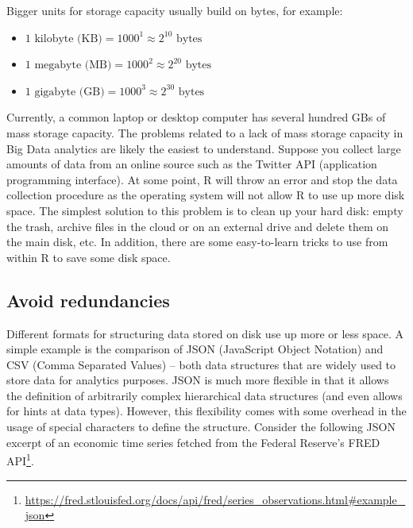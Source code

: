 \documentclass[
  12pt,
]{style/krantz}
\providecommand{\tightlist}{%
  \setlength{\itemsep}{0pt}\setlength{\parskip}{0pt}}
\renewcommand{\href}[2]{#2\footnote{\url{#1}}}
\begin{document}
Bigger units for storage capacity usually build on bytes, for example:

\begin{itemize}
\tightlist
\item
  \(1 \text{ kilobyte (KB)} = 1000^{1} \approx 2^{10} \text{ bytes}\)
\item
  \(1 \text{ megabyte (MB)} = 1000^{2} \approx 2^{20} \text{ bytes}\)
\item
  \(1 \text{ gigabyte (GB)} = 1000^{3} \approx 2^{30} \text{ bytes}\)
\end{itemize}

Currently, a common laptop or desktop computer has several hundred GBs of mass storage capacity. The problems related to a lack of mass storage capacity in Big Data analytics are likely the easiest to understand. Suppose you collect large amounts of data from an online source such as the Twitter API (application programming interface). At some point, R will throw an error and stop the data collection procedure as the operating system will not allow R to use up more disk space. The simplest solution to this problem is to clean up your hard disk: empty the trash, archive files in the cloud or on an external drive and delete them on the main disk, etc. In addition, there are some easy-to-learn tricks to use from within R to save some disk space.

\hypertarget{avoid-redundancies}{%
\subsection{Avoid redundancies}\label{avoid-redundancies}}

Different formats for structuring data stored on disk use up more or less space. A simple example is the comparison of JSON (JavaScript Object Notation) and CSV (Comma Separated Values) -- both data structures that are widely used to store data for analytics purposes. JSON is much more flexible in that it allows the definition of arbitrarily complex hierarchical data structures (and even allows for hints at data types). However, this flexibility comes with some overhead in the usage of special characters to define the structure. Consider the following JSON excerpt of an economic time series fetched from the Federal Reserve's \href{https://fred.stlouisfed.org/docs/api/fred/series_observations.html\#example_json}{FRED API}.
\end{document}
